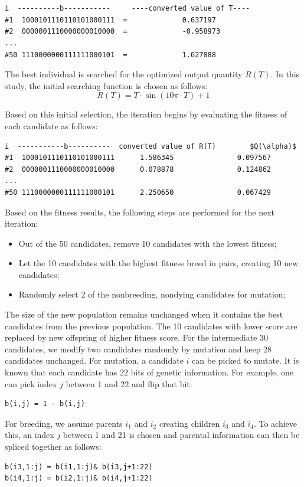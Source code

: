 \documentclass[final,5p,times,twocolumn]{elsarticle}
\begin{document}
\begin{lstlisting}


i  ----------b-----------     ----converted value of T----   
#1  1000101110110101000111  =             0.637197               
#2  0000001110000000010000  =             -0.958973              
...
#50 1110000000111111000101  =             1.627888               
\end{lstlisting}
The best individual is searched for the optimized output quantity $R(T)$.
\vskip 0.1in
In this study, the initial searching function is chosen as follows:
\begin{equation}	
R(T) = T \cdot \sin ( 10 \pi \cdot T ) + 1
\end{equation}

Based on this initial selection, the iteration begins by evaluating the fitness of each candidate as follows:
\begin{lstlisting}
i  -----------b----------  converted value of R(T)        $Q(\alpha)$
#1  1000101110110101000111      1.586345               0.097567
#2  0000001110000000010000      0.078878               0.124862
...
#50 1110000000111111000101      2.250650               0.067429
\end{lstlisting}	



Based on the fitness results, the following steps are performed for the next
iteration:
\begin{itemize}
	\item {Out of the 50 candidates, remove 10 candidates with the lowest fitness; }
	\item {Let the 10 candidates with the highest fitness breed in pairs, creating 10 new candidates;}
	\item {Randomly select 2 of the nonbreeding, nondying candidates for mutation;}
\end{itemize}
\vskip 0.1in
The size of the new population remains unchanged when it contains the best candidates from the previous population. The 10 candidates with lower score are replaced by new offspring of higher fitness score. For the intermediate 30 candidates, we modify two candidates randomly by mutation and keep 28 candidates unchanged.
\vskip 0.1in
For mutation, a candidate $i$ can be picked to mutate. It is known that each candidate
has 22 bits of genetic information. For example, one can pick index $j$ between 1 and 22 and
flip that bit:

\begin{lstlisting}
b(i,j) = 1 - b(i,j)
\end{lstlisting}
\vskip 0.1in
For breeding, we assume parents $i_1$ and $i_2$ creating children $i_3$ and $i_4$.
To achieve this, an index $j$ between 1 and 21 is chosen and parental information can then be spliced together as follows:
\begin{lstlisting}
b(i3,1:j) = b(i1,1:j)& b(i3,j+1:22)
b(i4,1:j) = b(i2,1:j)& b(i4,j+1:22)
\end{lstlisting}
\end{document}
